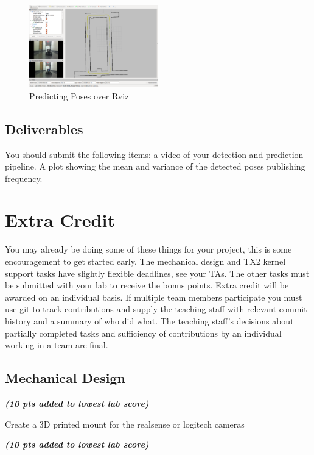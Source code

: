 \documentclass[letta4 paper]{article}
\begin{document}
\begin{figure}[h]
  \centering
    \includegraphics[width=0.5\textwidth]{waypoints.png}
   \caption{Predicting Poses over Rviz}
\end{figure}


\subsection{Deliverables}
You should submit the following items: a video of your detection and prediction pipeline. A plot showing the mean and variance of the detected poses publishing frequency. 

\section{Extra Credit}
You may already be doing some of these things for your project, this is some encouragement to get started early. The mechanical design and TX2 kernel support tasks have slightly flexible deadlines, see your TAs. The other tasks must be submitted with your lab to receive the bonus points. Extra credit will be awarded on an individual basis. If multiple team members participate you must use git to track contributions and supply the teaching staff with relevant commit history and a summary of who did what. The teaching staff's decisions about partially completed tasks and sufficiency of contributions by an individual working in a team are final. 

\subsection{Mechanical Design} \textit{\textbf{(10 pts added to lowest lab score)}}

\noindent Create a 3D printed mount for the realsense or logitech cameras
\newline

\noindent\textit{\textbf{(10 pts added to lowest lab score)}}
\end{document}
